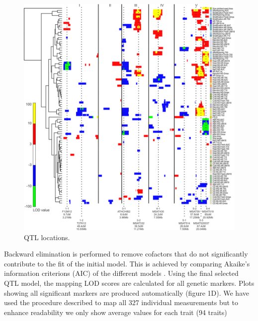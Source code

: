 \begin{figure}[h!]
  \centering
  \includegraphics[keepaspectratio,scale=0.30]{eps/image_3_1_4.eps}
  \caption[QTL locations.]
    {QTL locations.}
\end{figure}

Backward elimination is performed to remove cofactors that do not significantly contribute to the fit 
of the initial model. This is achieved by comparing Akaike's information criterions (AIC) of the 
different models \cite{Jansen:1993}. Using the final selected QTL model, the mapping LOD scores are 
calculated for all genetic markers. Plots showing all significant markers are produced automatically 
(figure 1D). We have used the procedure described to map all 327 individual measurements but to enhance
readability we only show average values for each trait (94 traits)

